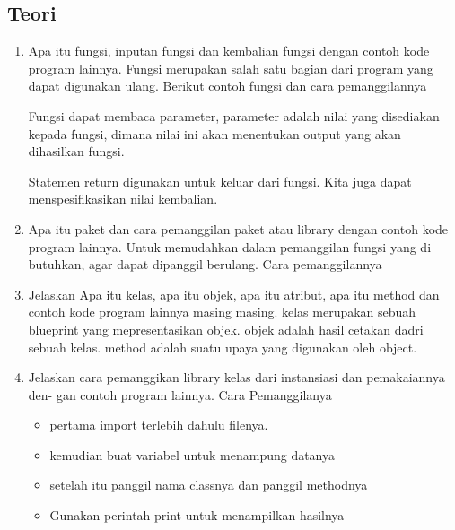\subsection{Teori}
\begin{enumerate}
    \item Apa itu fungsi, inputan fungsi dan kembalian fungsi dengan contoh kode program
    lainnya.
    Fungsi merupakan salah satu bagian dari program yang dapat digunakan ulang.
    Berikut contoh fungsi dan cara pemanggilannya
    

    Fungsi dapat membaca parameter, parameter adalah nilai yang disediakan kepada fungsi, dimana nilai ini akan menentukan output yang akan dihasilkan fungsi.
    

    Statemen return digunakan untuk keluar dari fungsi. Kita juga dapat menspesifikasikan nilai kembalian.
    

    \item Apa itu paket dan cara pemanggilan paket atau library dengan contoh kode
    program lainnya.
    Untuk memudahkan dalam pemanggilan fungsi yang di butuhkan, agar dapat dipanggil berulang.
    Cara pemanggilannya
    

    \item Jelaskan Apa itu kelas, apa itu objek, apa itu atribut, apa itu method dan
    contoh kode program lainnya masing masing.
    kelas merupakan sebuah blueprint yang mepresentasikan objek.
    objek adalah hasil cetakan dadri sebuah kelas.
    method adalah suatu upaya yang digunakan oleh object.
    

    \item Jelaskan cara pemanggikan library kelas dari instansiasi dan pemakaiannya den-
    gan contoh program lainnya.
    Cara Pemanggilanya 
    \begin{itemize}
        \item pertama import terlebih dahulu filenya.
        \item kemudian buat variabel untuk menampung datanya
        \item setelah itu panggil nama classnya dan panggil methodnya
        \item Gunakan perintah print untuk menampilkan hasilnya


\end{itemize}
\end{enumerate}
